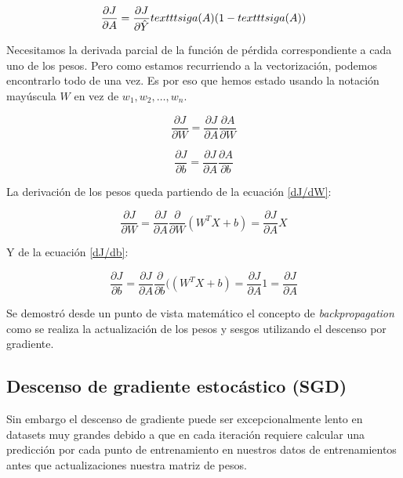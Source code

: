 \documentclass[a4paper,12pt]{article}
\begin{document}
\begin{equation}
\frac{\partial J}{\partial A} = \frac{\partial J} {\partial \hat{Y}} \\texttt{sig}a(A) (1-\\texttt{sig}a(A))
\end{equation}

Necesitamos la derivada parcial de la función de pérdida correspondiente a cada uno de los pesos. Pero como estamos recurriendo a la vectorización, podemos encontrarlo todo de una vez. Es por eso que hemos estado usando la notación mayúscula $W$ en vez de $w_1, w_2, \ldots, w_n$.

\begin{equation}
\frac{\partial J}{\partial W} = \frac{\partial J}{\partial A} \frac{\partial A}{\partial W}
\label{dJ/dW}
\end{equation}

\begin{equation}
\frac{\partial J}{\partial b} = \frac{\partial J}{\partial A} \frac{\partial A}{\partial b}
\label{dJ/db}
\end{equation}

La derivación de los pesos queda partiendo de la ecuación \ref{dJ/dW}:

\begin{equation}
\frac{\partial J}{\partial W} = \frac{\partial J}{\partial A} \frac{\partial}{\partial W}(W^T X + b) = \frac{\partial J}{\partial A} X
\end{equation}

Y de la ecuación \ref{dJ/db}:

\begin{equation}
\frac{\partial J}{\partial b} = \frac{\partial J}{\partial A} \frac{\partial}{\partial b}((W^T X + b) = \frac{\partial J}{\partial A} 1 = \frac{\partial J}{\partial A}
\end{equation}

Se demostró desde un punto de vista matemático el concepto de \textit{backpropagation} como se realiza la actualización de los pesos y sesgos utilizando el descenso por gradiente.

\subsection{Descenso de gradiente estocástico (SGD)}
Sin embargo el descenso de gradiente puede ser excepcionalmente lento en datasets muy grandes debido a que en cada iteración requiere calcular una predicción por cada punto de entrenamiento en nuestros datos de entrenamientos antes que actualizaciones nuestra matriz de pesos.
\end{document}
